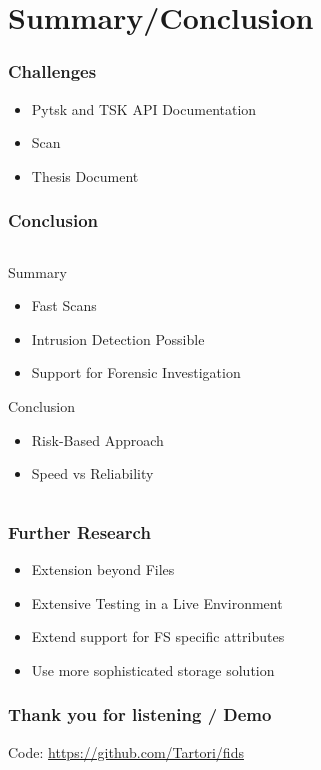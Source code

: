 \documentclass{beamer}
\begin{document}
\section{Summary/Conclusion}

\begin{frame}[fragile]
  \frametitle{Challenges}
    \begin{itemize}
      \item Pytsk and TSK API Documentation
      \item Scan
      \item Thesis Document
    \end{itemize}
\end{frame}

\begin{frame}[fragile]
  \frametitle{Conclusion}
  \begin{columns}
    \begin{column}{1\textwidth}
      Summary
      \begin{itemize}
          \item Fast Scans
          \item Intrusion Detection Possible
          \item Support for Forensic Investigation
      \end{itemize}
      \pause
      Conclusion
      \begin{itemize}
        \item Risk-Based Approach
        \item Speed vs Reliability
      \end{itemize}
    \end{column}
  \end{columns}
\end{frame}

\begin{frame}[fragile]
  \frametitle{Further Research}
    \begin{itemize}
      \item Extension beyond Files
      \item Extensive Testing in a Live Environment
      \item Extend support for FS specific attributes
      \item Use more sophisticated storage solution
    \end{itemize}
\end{frame}


\begin{frame}
  \frametitle{Thank you for listening / Demo}
  Code: \url{https://github.com/Tartori/fids}
\end{frame}
\end{document}
